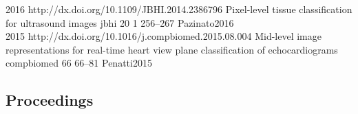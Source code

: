 \begin{publications}
  {
  }
  {2016}
  {http://dx.doi.org/10.1109/JBHI.2014.2386796}
  {Pixel-level tissue classification for ultrasound images}
  {jbhi}
  {20}
  {1}
  {256--267}
  {Pazinato2016}
  \\

  {
  }
  {2015}
  {http://dx.doi.org/10.1016/j.compbiomed.2015.08.004}
  {Mid-level image representations for real-time heart view plane classification of echocardiograms}
  {compbiomed}
  {66}
  {}
  {66--81}
  {Penatti2015}
  \\

\end{publications}

\subsection*{Proceedings}

